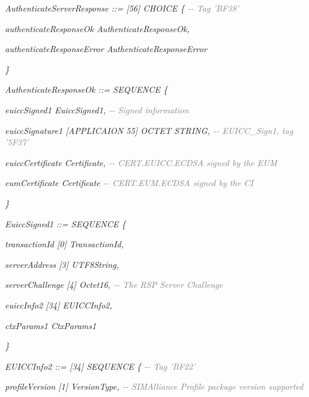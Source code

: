 \documentclass[10pt, oneside]{book}
\begin{document}
\textit{AuthenticateServerResponse ::= [56] CHOICE \{ \textcolor{gray}{{-}{-} Tag 'BF38'}}

\hspace{0.75cm} \textit{authenticateResponseOk AuthenticateResponseOk,}

\hspace{0.75cm} \textit{authenticateResponseError AuthenticateResponseError}

\textit{\}\\}

\textit{AuthenticateResponseOk ::= SEQUENCE \{}

\hspace{0.75cm} \textit{euiccSigned1 EuiccSigned1, \textcolor{gray}{{-}{-} Signed information}}

\hspace{0.75cm} \textit{euiccSignature1 [APPLICAION 55] OCTET STRING, \textcolor{gray}{{-}{-} EUICC\_Sign1, tag '5F37'}}

\hspace{0.75cm} \textit{euiccCertificate Certificate, \textcolor{gray}{{-}{-} CERT.EUICC.ECDSA signed by the EUM}}

\hspace{0.75cm} \textit{eumCertificate Certificate \textcolor{gray}{{-}{-} CERT.EUM.ECDSA signed by the CI}}

\textit{\}\\}

\textit{EuiccSigned1 ::= SEQUENCE \{}

\hspace{0.75cm} \textit{transactionId [0] TransactionId,}

\hspace{0.75cm} \textit{serverAddress [3] UTF8String,}

\hspace{0.75cm} \textit{serverChallenge [4] Octet16, \textcolor{gray}{{-}{-} The RSP Server Challenge}}

\hspace{0.75cm} \textit{euiccInfo2 [34] EUICCInfo2,}

\hspace{0.75cm} \textit{ctxParams1 CtxParams1}

\textit{\}\\}

\textit{EUICCInfo2 ::= [34] SEQUENCE \{ \textcolor{gray}{{-}{-} Tag 'BF22'}}

\hspace{0.75cm} \textit{profileVersion [1] VersionType, \textcolor{gray}{{-}{-} SIMAlliance Profile package version supported}}
\end{document}
